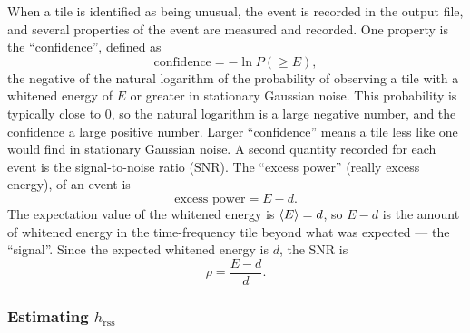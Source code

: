 \documentclass{article}
\begin{document}
When a tile is identified as being unusual, the event is recorded in the
output file, and several properties of the event are measured and recorded.
One property is the ``confidence'', defined as
\begin{equation}
\text{confidence}
   = -\ln P(\geq E),
\end{equation}
the negative of the natural logarithm of the probability of observing a
tile with a whitened energy of \(E\) or greater in stationary Gaussian
noise.  This probability is typically close to 0, so the natural logarithm
is a large negative number, and the confidence a large positive number.
Larger ``confidence'' means a tile less like one would find in stationary
Gaussian noise.  A second quantity recorded for each event is the
signal-to-noise ratio (SNR).  The ``excess power'' (really excess energy),
of an event is
\begin{equation}
\text{excess power}
   = E - d.
\end{equation}
The expectation value of the whitened energy is \(\left\langle E\right\rangle = d\), so \(E -
d\) is the amount of whitened energy in the time-frequency tile beyond what
was expected --- the ``signal''.  Since the expected whitened energy is
\(d\), the SNR is
\begin{equation}
\rho
   = \frac{E - d}{d}.
\end{equation}


\subsubsection{Estimating \(h_{\text{rss}}\)}
\end{document}
